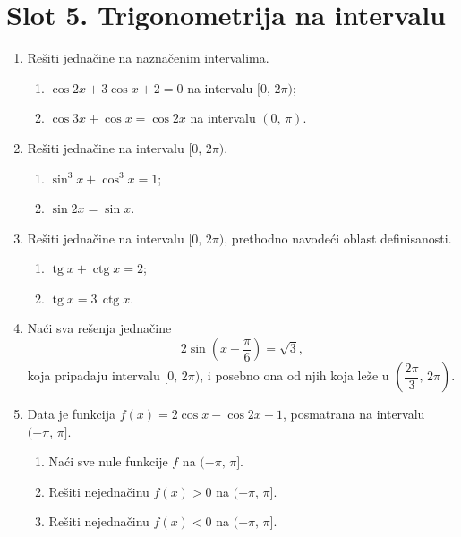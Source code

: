 \section*{Slot 5. Trigonometrija na intervalu}
\begin{enumerate}[label=\arabic*.]
\item Rešiti jednačine na naznačenim intervalima.
\begin{enumerate}[label=\alph*)]
\item $\cos 2x + 3\cos x + 2 = 0$ na intervalu $[0,\,2\pi)$;
\item $\cos 3x + \cos x = \cos 2x$ na intervalu $(0,\,\pi)$.
\end{enumerate}

\item Rešiti jednačine na intervalu $[0,\,2\pi)$.
\begin{enumerate}[label=\alph*)]
\item $\sin^3 x + \cos^3 x = 1$;
\item $\sin 2x = \sin x$.
\end{enumerate}

\item Rešiti jednačine na intervalu $[0,\,2\pi)$, prethodno navodeći oblast definisanosti.
\begin{enumerate}[label=\alph*)]
\item $\operatorname{tg} x + \operatorname{ctg} x = 2$;
\item $\operatorname{tg} x = 3\,\operatorname{ctg} x$.
\end{enumerate}

\item Naći sva rešenja jednačine
\[2\sin\!\left(x-\frac{\pi}{6}\right)=\sqrt3,\]
koja pripadaju intervalu $[0,\,2\pi)$, i posebno ona od njih koja leže u $\left(\dfrac{2\pi}{3},\,2\pi\right)$.

\item Data je funkcija $f(x)=2\cos x-\cos 2x-1$, posmatrana na intervalu $(-\pi,\,\pi]$.
\begin{enumerate}[label=\alph*)]
\item Naći sve nule funkcije $f$ na $(-\pi,\,\pi]$.
\item Rešiti nejednačinu $f(x)>0$ na $(-\pi,\,\pi]$.
\item Rešiti nejednačinu $f(x)<0$ na $(-\pi,\,\pi]$.
\end{enumerate}
\end{enumerate}
\clearpage
